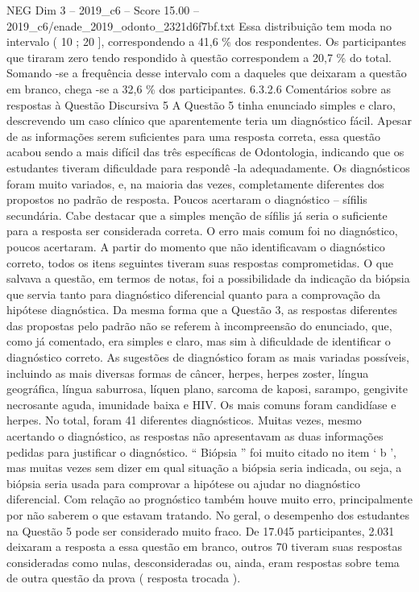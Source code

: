\begin{textsample}{NEG Dim 3 – 2019\_c6 – Score 15.00 – 2019\_c6/enade\_2019\_odonto\_2321d6f7bf.txt}
Essa distribuição tem moda no intervalo ( 10 ; 20 ], correspondendo a 41,6 \% dos respondentes.
Os participantes que tiraram zero tendo respondido à questão correspondem a 20,7 \% do total.
Somando -se a frequência desse intervalo com a daqueles que deixaram a questão em branco, chega -se a 32,6 \% dos participantes. 6.3.2.6 Comentários sobre as respostas à Questão Discursiva 5 A Questão 5 tinha enunciado simples e claro, descrevendo um caso clínico que aparentemente teria um diagnóstico fácil.
Apesar de as informações serem suficientes para uma resposta correta, essa questão acabou sendo a mais difícil das três específicas de Odontologia, indicando que os estudantes tiveram dificuldade para respondê -la adequadamente.
Os diagnósticos foram muito variados, e, na maioria das vezes, completamente diferentes dos propostos no padrão de resposta.
Poucos acertaram o diagnóstico – sífilis secundária.
Cabe destacar que a simples menção de sífilis já seria o suficiente para a resposta ser considerada correta.
O erro mais comum foi no diagnóstico, poucos acertaram.
A partir do momento que não identificavam o diagnóstico correto, todos os itens seguintes tiveram suas respostas comprometidas.
O que salvava a questão, em termos de notas, foi a possibilidade da indicação da biópsia que servia tanto para diagnóstico diferencial quanto para a comprovação da hipótese diagnóstica.
Da mesma forma que a Questão 3, as respostas diferentes das propostas pelo padrão não se referem à incompreensão do enunciado, que, como já comentado, era simples e claro, mas sim à dificuldade de identificar o diagnóstico correto.
As sugestões de diagnóstico foram as mais variadas possíveis, incluindo as mais diversas formas de câncer, herpes, herpes zoster, língua geográfica, língua saburrosa, líquen plano, sarcoma de kaposi, sarampo, gengivite necrosante aguda, imunidade baixa e HIV.
Os mais comuns foram candidíase e herpes.
No total, foram 41 diferentes diagnósticos.
Muitas vezes, mesmo acertando o diagnóstico, as respostas não apresentavam as duas informações pedidas para justificar o diagnóstico. “ Biópsia ” foi muito citado no item ‘ b ’, mas muitas vezes sem dizer em qual situação a biópsia seria indicada, ou seja, a biópsia seria usada para comprovar a hipótese ou ajudar no diagnóstico diferencial.
Com relação ao prognóstico também houve muito erro, principalmente por não saberem o que estavam tratando.
No geral, o desempenho dos estudantes na Questão 5 pode ser considerado muito fraco.
De 17.045 participantes, 2.031 deixaram a resposta a essa questão em branco, outros 70 tiveram suas respostas consideradas como nulas, desconsideradas ou, ainda, eram respostas sobre tema de outra questão da prova ( resposta trocada ).

\end{textsample}
